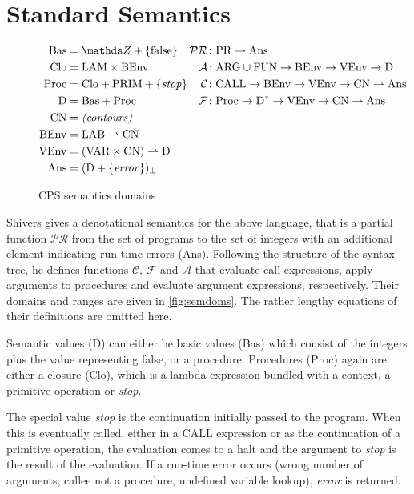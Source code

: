 \documentclass[a4paper,parskip=half,BCOR=8mm,DIV=calc,12pt]{scrbook}
\newcommand{\C}{\mathcal C}
\newcommand{\F}{\mathcal F}
\newcommand{\PR}{\mathcal {PR}}
\newcommand{\A}{\mathcal A}
\begin{document}
\section{Standard Semantics}
\begin{figure}
\setlength{\FrameSep}{0pt}
\begin{framed}
\begin{align*}
\text{Bas} &= \mathds Z + \{\text{false}\} 
						& \mathllap{\PR} &\colon \text{PR} \rightharpoonup \text{Ans} \\
\text{Clo} &= \text{LAM} \times \text{BEnv} 
						& \A &\colon \text{ARG}\cup\text{FUN} \to \text{BEnv} \to \text{VEnv} \to \text{D} \\
\text{Proc} &= \text{Clo} + \text{PRIM} + \{\text{\textit{stop}}\} 
						& \C &\colon \text{CALL}\to \text{BEnv} \to \text{VEnv} \to \text{CN} \rightharpoonup \text{Ans} \\
\text{D} &= \text{Bas} + \text{Proc}
						& \F &\colon \text{Proc}\to \text{D}^* \to \text{VEnv} \to \text{CN} \rightharpoonup \text{Ans} \\
\text{CN} &= \text{\textit{(contours)}} \\
\text{BEnv} &= \text{LAB} \rightharpoonup \text{CN} \\
\text{VEnv} &= (\text{VAR}\times\text{CN}) \rightharpoonup \text{D}\\
\text{Ans} &= (\text D + \{\text{\textit{error}}\})_\bot
\end{align*}
\end{framed}
\caption{CPS semantics domains}
\label{fig:semdoms}
\end{figure}


Shivers gives a denotational semantics for the above language, that is a partial function $\PR$ from the set of programs to the set of integers with an additional element indicating run-time errors (Ans). Following the structure of the syntax tree, he defines functions $\C$, $\F$ and $\A$ that evaluate call expressions, apply arguments to procedures and evaluate argument expressions, respectively. Their domains and ranges are given in \vref{fig:semdoms}. The rather lengthy equations of their definitions are omitted here.

Semantic values (D) can either be basic values (Bas) which consist of the integers plus the value representing false, or a procedure. Procedures (Proc) again are either a closure (Clo), which is a lambda expression bundled with a context, a primitive operation or \textit{stop}.

The special value \textit{stop} is the continuation initially passed to the program. When this is eventually called, either in a CALL expression or as the continuation of a primitive operation, the evaluation comes to a halt and the argument to \textit{stop} is the result of the evaluation. If a run-time error occurs (wrong number of arguments, callee not a procedure, undefined variable lookup), \textit{error} is returned.
\end{document}
